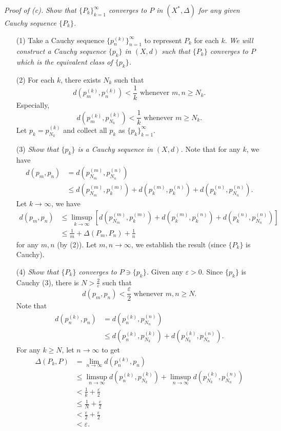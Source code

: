 \documentclass{article}
\begin{document}
\emph{Proof of (c).}
\emph{Show that $\{P_k\}_{k=1}^{\infty}$ converges to $P$ in $(X^*, \Delta)$
for any given Cauchy sequence $\{P_k\}$.}
\begin{enumerate}
\item[(1)]
Take a Cauchy sequence $\{ p^{(k)}_n \}_{n=1}^{\infty}$ to represent $P_k$ for each $k$.
\emph{We will construct a Cauchy sequence $\{ p_k \}$ in $(X,d)$ such that
$\{P_k\}$ converges to $P$ which is the equivalent class of $\{ p_k \}$.}
\item[(2)]
For each $k$,
there exists $N_k$ such that
$$d\left(p^{(k)}_m,p^{(k)}_n\right) < \frac{1}{k} \text{ whenever } m,n \geq N_k.$$
Especially,
$$d\left(p^{(k)}_m,p^{(k)}_{N_k}\right) < \frac{1}{k} \text{ whenever } m \geq N_k.$$
Let $p_k = p^{(k)}_{N_k}$ and collect all $p_k$ as $\{ p_k \}_{k=1}^{\infty}$.
\item[(3)]
\emph{Show that $\{p_k\}$ is a Cauchy sequence in $(X,d)$.}
Note that for any $k$, we have
  \begin{align*}
    d(p_m,p_n)
    &= d\left(p^{(m)}_{N_m},p^{(n)}_{N_n}\right) \\
    &\leq d\left(p^{(m)}_{N_m},p^{(m)}_k\right)
      + d\left(p^{(m)}_k,p^{(n)}_k\right)
      + d\left(p^{(n)}_k,p^{(n)}_{N_n}\right).
  \end{align*}
Let $k \to \infty$, we have
  \begin{align*}
    d(p_m,p_n)
    &\leq \limsup_{k \to \infty}\left[ d\left(p^{(m)}_{N_m},p^{(m)}_k\right)
      + d\left(p^{(m)}_k,p^{(n)}_k\right)
      + d\left(p^{(n)}_k,p^{(n)}_{N_n}\right) \right] \\
    &\leq \frac{1}{m} + \Delta(P_m,P_n) + \frac{1}{n}
  \end{align*}
for any $m, n$ (by (2)).
Let $m, n \to \infty$, we establish the result (since $\{P_k\}$ is Cauchy).
\item[(4)]
\emph{Show that $\{P_k\}$ converges to $P \ni \{ p_k \}$.}
Given any $\varepsilon > 0$.
Since $\{p_k\}$ is Cauchy (3), there is $N > \frac{2}{\varepsilon}$ such that
$$d(p_m,p_n) < \frac{\varepsilon}{2} \text{ whenever } m,n \geq N.$$
Note that
  \begin{align*}
    d\left(p^{(k)}_n,p_n\right)
    &= d\left(p^{(k)}_n,p^{(n)}_{N_n}\right) \\
    &\leq d\left(p^{(k)}_n,p^{(k)}_{N_k}\right)
      + d\left(p^{(k)}_{N_k},p^{(n)}_{N_n}\right).
  \end{align*}
For any $k \geq N$, let $n \to \infty$ to get
  \begin{align*}
    \Delta(P_k,P)
    &= \lim_{n \to \infty} d\left(p^{(k)}_n,p_n\right) \\
    &\leq \limsup_{n \to \infty} d\left(p^{(k)}_n,p^{(k)}_{N_k}\right)
      + \limsup_{n \to \infty} d\left(p^{(k)}_{N_k},p^{(n)}_{N_n}\right) \\
    &< \frac{1}{k} + \frac{\varepsilon}{2} \\
    &\leq \frac{1}{N} + \frac{\varepsilon}{2} \\
    &< \frac{\varepsilon}{2} + \frac{\varepsilon}{2} \\
    &< \varepsilon.
  \end{align*}
\end{enumerate}
\end{document}
